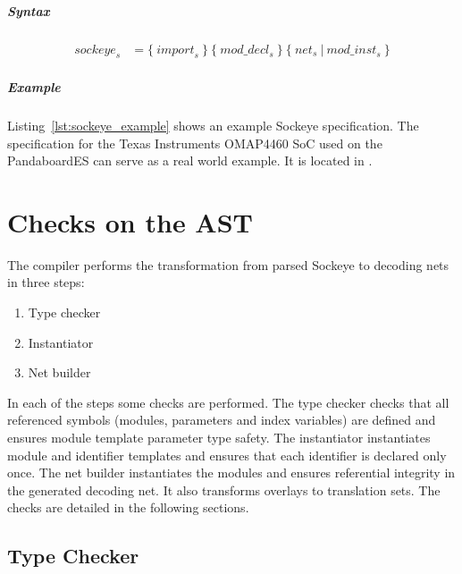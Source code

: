 \documentclass[a4paper,11pt,twoside]{report}
\begin{document}
{{{\paragraph{Syntax}
\begin{align*}
    \textit{sockeye}_s & \mathop{=}
        \big\{\ 
            \textit{import}_s\ 
        \big\}\ 
        \big\{\ 
            \textit{mod\_decl}_s\ 
        \big\}\ 
        \big\{\ 
            \textit{net}_s\ |\ \textit{mod\_inst}_s\ 
        \big\}
\end{align*}

\paragraph{Example}
Listing~\ref{lst:sockeye_example} shows an example Sockeye specification.
The specification for the Texas Instruments OMAP4460 SoC used on the PandaboardES can serve as a real world example. It is located in .

\clearpage



\chapter{Checks on the AST}
\label{chap:checks}
The compiler performs the transformation from parsed Sockeye to decoding nets in three steps:
\begin{enumerate}
    \item Type checker
    \item Instantiator
    \item Net builder
\end{enumerate}
In each of the steps some checks are performed.
The type checker checks that all referenced symbols (modules, parameters and index variables) are defined and ensures module template parameter type safety.
The instantiator instantiates module and identifier templates and ensures that each identifier is declared only once.
The net builder instantiates the modules and ensures referential integrity in the generated decoding net. It also transforms overlays to translation sets.
The checks are detailed in the following sections.

\section{Type Checker}
}}}
\end{document}
